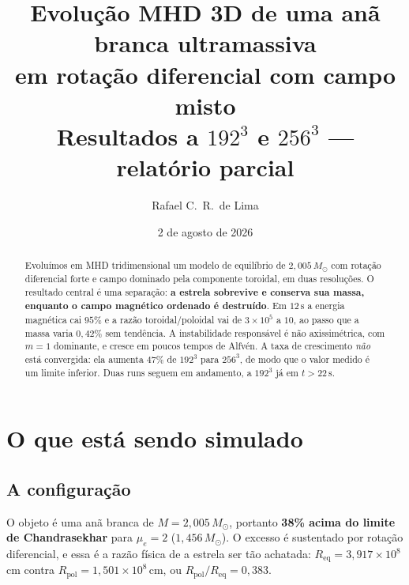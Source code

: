 \documentclass[11pt,a4paper]{article}
\title{\textbf{Evolução MHD 3D de uma anã branca ultramassiva\\
em rotação diferencial com campo misto}\\[0.3em]
\large Resultados a $192^3$ e $256^3$ --- relatório parcial}
\author{Rafael C.\ R.\ de Lima}
\date{2 de agosto de 2026}
\newcommand{\Msun}{M_\odot}
\newcommand{\Req}{R_{\mathrm{eq}}}
\newcommand{\Rpol}{R_{\mathrm{pol}}}
\begin{document}
\maketitle

\begin{abstract}
\noindent
Evoluímos em MHD tridimensional um modelo de equilíbrio de $2{,}005\,\Msun$ com
rotação diferencial forte e campo dominado pela componente toroidal, em duas
resoluções. O resultado central é uma separação: \textbf{a estrela sobrevive e
conserva sua massa, enquanto o campo magnético ordenado é destruído}. Em
$12\,\mathrm{s}$ a energia magnética cai $95\%$ e a razão toroidal/poloidal vai
de $3\times10^5$ a $10$, ao passo que a massa varia $0{,}42\%$ sem tendência. A
instabilidade responsável é não axissimétrica, com $m=1$ dominante, e cresce em
poucos tempos de Alfvén. A taxa de crescimento \emph{não} está convergida: ela
aumenta $47\%$ de $192^3$ para $256^3$, de modo que o valor medido é um limite
inferior. Duas runs seguem em andamento, a $192^3$ já em $t>22\,\mathrm{s}$.
\end{abstract}

\section{O que está sendo simulado}

\subsection{A configuração}

O objeto é uma anã branca de $M = 2{,}005\,\Msun$, portanto \textbf{38\% acima
do limite de Chandrasekhar} para $\mu_e = 2$ ($1{,}456\,\Msun$). O excesso é
sustentado por rotação diferencial, e essa é a razão física de a estrela ser tão
achatada: $\Req = 3{,}917\times10^8$\,cm contra $\Rpol = 1{,}501\times10^8$\,cm,
ou $\Rpol/\Req = 0{,}383$.
\end{document}
